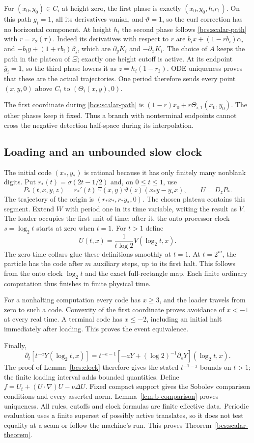 For $(x_0,y_0)\in C_i$ at height zero, the first phase is exactly
$(x_0,y_0,h_i r_1)$. On this path $g_i=1$, all its derivatives vanish, and $\vartheta=1$, so the curl correction has no horizontal component. At height $h_i$ the second phase follows \eqref{bcs:scalar-path} with $r=r_2(\tau)$.
Indeed its derivatives with respect to $r$ are
$b_i x+(1-rb_i)\alpha_i$ and $-b_i y+(1+rb_i)\beta_i$, which are $\partial_yK_i$ and $-\partial_xK_i$. The choice of $A$ keeps the path in the plateau of $\Xi$; exactly one height cutoff is active. At its endpoint $\bar g_i=1$, so the third phase lowers it as $z=h_i(1-r_3)$. ODE uniqueness proves that these are the actual trajectories. One period therefore sends every point $(x,y,0)$ above $C_i$ to $(\Theta_i(x,y),0)$.

The first coordinate during \eqref{bcs:scalar-path} is
$(1-r)x_0+r\Theta_{i,1}(x_0,y_0)$. The other phases keep it fixed. Thus a branch with nonterminal endpoints cannot cross the negative detection half-space during its interpolation.

\subsection{Loading and an unbounded slow clock}
The initial code $(x_*,y_*)$ is rational because it has only finitely many nonblank digits. Put $r_*(t)=\sigma(2t-1/2)$ and, on $0\le t\le1$, use
\[
 P_*(t,x,y,z)=r_*'(t)\Xi(x,y)\vartheta(z)(x_*y-y_*x),\qquad U=D_zP_*.
\]
The trajectory of the origin is $(r_*x_*,r_*y_*,0)$. The chosen plateau contains this segment. Extend $W$ with period one in its time variable, writing the result as $V$. The loader occupies the first unit of time; after it, the onto processor clock $s=\log_2t$ starts at zero when $t=1$. For $t>1$ define
\[
 U(t,x)=\frac1{t\log2}V(\log_2t,x).
\]
The zero time collars glue these definitions smoothly at $t=1$. At $t=2^m$, the particle has the code after $m$ auxiliary steps, up to its first halt. This follows from the onto clock $\log_2t$ and the exact full-rectangle map. Each finite ordinary computation thus finishes in finite physical time.

For a nonhalting computation every code has $x\ge3$, and the loader travels from zero to such a code. Convexity of the first coordinate proves avoidance of $x<-1$ at every real time. A terminal code has $x\le-2$, including an initial halt immediately after loading. This proves the event equivalence.

Finally,
\[
 \partial_t[t^{-a}Y(\log_2t,x)]
 =t^{-a-1}[-aY+(\log2)^{-1}\partial_sY](\log_2t,x).
\]
The proof of Lemma~\ref{bcs:clock} therefore gives the stated $t^{-1-j}$ bounds on $t>1$; the finite loading interval adds bounded quantities. Define $f=U_t+(U\cdot\nabla)U-\nu\Delta U$. Fixed compact support gives the Sobolev comparison conditions and every asserted norm. Lemma~\ref{lem:b-comparison} proves uniqueness. All rules, cutoffs and clock formulas are finite effective data. Periodic evaluation uses a finite superset of possibly active translates, so it does not test equality at a seam or follow the machine's run. This proves Theorem~\ref{bcs:scalar-theorem}.
